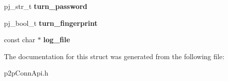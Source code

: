 \begin{DoxyCompactItemize}
\item 
\hypertarget{structP2pConnectionOptions_a84fc563db0bbd3e4bc7222fe2f160636}{
pj\_\-str\_\-t {\bfseries turn\_\-password}}
\label{structP2pConnectionOptions_a84fc563db0bbd3e4bc7222fe2f160636}

\item 
\hypertarget{structP2pConnectionOptions_a995e2db2298d3b1286b18b9e87f8e6ef}{
pj\_\-bool\_\-t {\bfseries turn\_\-fingerprint}}
\label{structP2pConnectionOptions_a995e2db2298d3b1286b18b9e87f8e6ef}

\item 
\hypertarget{structP2pConnectionOptions_adfb6f71a25a33568517c016e47321180}{
const char $\ast$ {\bfseries log\_\-file}}
\label{structP2pConnectionOptions_adfb6f71a25a33568517c016e47321180}

\end{DoxyCompactItemize}


The documentation for this struct was generated from the following file:\begin{DoxyCompactItemize}
\item 
p2pConnApi.h\end{DoxyCompactItemize}
